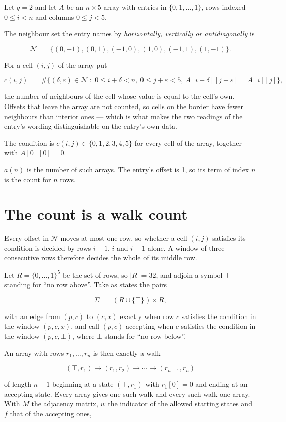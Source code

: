 \documentclass[11pt]{article}
\theoremstyle{definition}
\begin{document}
Let $q = 2$ and let $A$ be an $n \times 5$ array with entries in $\{0,1,\dots,1\}$, rows indexed $0 \le i < n$ and columns $0 \le j < 5$.

The neighbour set the entry names by {\itshape horizontally, vertically or antidiagonally} is

\[\mathcal{N} \;=\; \{(0,-1), (0,1), (-1,0), (1,0), (-1,1), (1,-1)\}.\]

For a cell $(i,j)$ of the array put

\[c(i,j) \;=\; \#\bigl\{(\delta,\varepsilon)\in\mathcal{N} \;:\; 0\le i+\delta<n,\ 0\le j+\varepsilon<5,\ A[i+\delta][j+\varepsilon] = A[i][j]\bigr\},\]

the number of neighbours of the cell whose value is equal to the cell's own. Offsets that leave the array are not counted, so cells on the border have fewer neighbours than interior ones --- which is what makes the two readings of the entry's wording distinguishable on the entry's own data.

The condition is $c(i,j) \in \{0, 1, 2, 3, 4, 5\}$ for every cell of the array, together with $A[0][0]=0$.

$a(n)$ is the number of such arrays. The entry's offset is 1, so its term of index $n$ is the count for $n$ rows.

\section{The count is a walk count}

Every offset in $\mathcal{N}$ moves at most one row, so whether a cell $(i,j)$ satisfies its condition is decided by rows $i-1$, $i$ and $i+1$ alone. A window of three consecutive rows therefore decides the whole of its middle row.

Let $R = \{0,\dots,1\}^{5}$ be the set of rows, so $|R| = 32$, and adjoin a symbol $\top$ standing for ``no row above''. Take as states the pairs

\[\Sigma \;=\; (R \cup \{\top\}) \times R,\]

with an edge from $(p,c)$ to $(c,x)$ exactly when row $c$ satisfies the condition in the window $(p,c,x)$, and call $(p,c)$ accepting when $c$ satisfies the condition in the window $(p,c,\bot)$, where $\bot$ stands for ``no row below''.

An array with rows $r_1,\dots,r_n$ is then exactly a walk

\[(\top,r_1) \to (r_1,r_2) \to \cdots \to (r_{n-1},r_n)\]

of length $n-1$ beginning at a state $(\top,r_1)$ with $r_1[0]=0$ and ending at an accepting state. Every array gives one such walk and every such walk one array. With $M$ the adjacency matrix, $w$ the indicator of the allowed starting states and $f$ that of the accepting ones,
\end{document}
